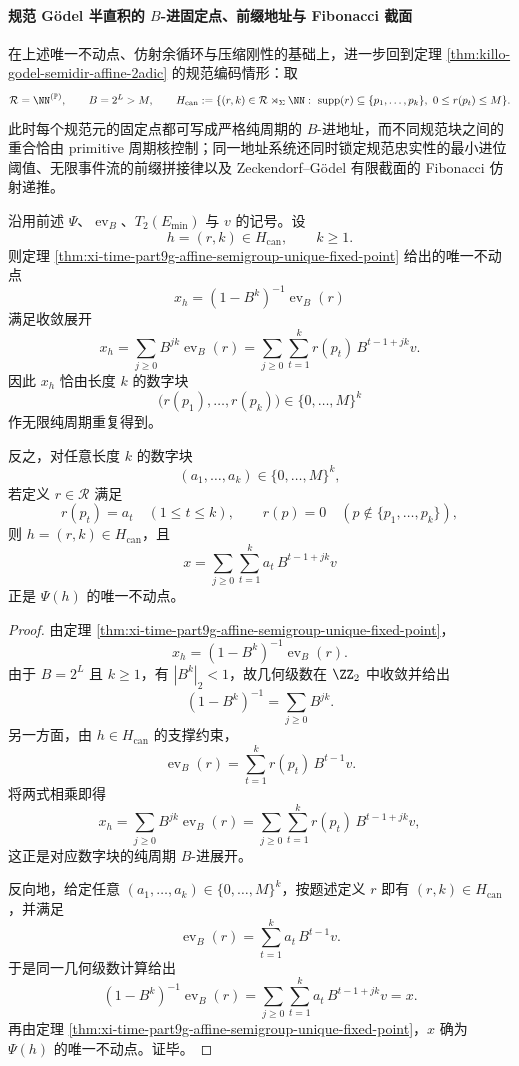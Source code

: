 \paragraph{规范 Gödel 半直积的 \texorpdfstring{$B$}{B}-进固定点、前缀地址与 Fibonacci 截面}
在上述唯一不动点、仿射余循环与压缩刚性的基础上，进一步回到定理 \ref{thm:killo-godel-semidir-affine-2adic} 的规范编码情形：取
\[
\mathcal R=\NN^{(\mathbb P)},
\qquad
B=2^L>M,
\qquad
H_{\mathrm{can}}
:=
\{(r,k)\in \mathcal R\rtimes_{\Sigma}\NN:\ \mathrm{supp}(r)\subseteq\{p_1,\dots,p_k\},\ 0\le r(p_t)\le M\}.
\]
此时每个规范元的固定点都可写成严格纯周期的 \(B\)-进地址，而不同规范块之间的重合恰由 primitive 周期核控制；同一地址系统还同时锁定规范忠实性的最小进位阈值、无限事件流的前缀拼接律以及 Zeckendorf--Gödel 有限截面的 Fibonacci 仿射递推。

\begin{theorem}\label{thm:xi-time-part9g-canonical-fixed-point-badic-periodic}
沿用前述 \(\Psi\)、\(\operatorname{ev}_B\)、\(T_2(E_{\min})\) 与 \(v\) 的记号。设
\[
h=(r,k)\in H_{\mathrm{can}},
\qquad
k\ge 1.
\]
则定理 \ref{thm:xi-time-part9g-affine-semigroup-unique-fixed-point} 给出的唯一不动点
\[
x_h=(1-B^k)^{-1}\operatorname{ev}_B(r)
\]
满足收敛展开
\[
x_h
=
\sum_{j\ge 0}B^{jk}\operatorname{ev}_B(r)
=
\sum_{j\ge 0}\sum_{t=1}^{k} r(p_t)\,B^{t-1+jk}v.
\]
因此 \(x_h\) 恰由长度 \(k\) 的数字块
\[
\bigl(r(p_1),\dots,r(p_k)\bigr)\in\{0,\dots,M\}^{k}
\]
作无限纯周期重复得到。

反之，对任意长度 \(k\) 的数字块
\[
(a_1,\dots,a_k)\in\{0,\dots,M\}^{k},
\]
若定义 \(r\in\mathcal R\) 满足
\[
r(p_t)=a_t\quad (1\le t\le k),
\qquad
r(p)=0\quad (p\notin\{p_1,\dots,p_k\}),
\]
则 \(h=(r,k)\in H_{\mathrm{can}}\)，且
\[
x=\sum_{j\ge 0}\sum_{t=1}^{k} a_t\,B^{t-1+jk}v
\]
正是 \(\Psi(h)\) 的唯一不动点。
\end{theorem}
\begin{proof}
由定理 \ref{thm:xi-time-part9g-affine-semigroup-unique-fixed-point}，
\[
x_h=(1-B^k)^{-1}\operatorname{ev}_B(r).
\]
由于 \(B=2^L\) 且 \(k\ge 1\)，有 \(|B^k|_2<1\)，故几何级数在 \(\ZZ_2\) 中收敛并给出
\[
(1-B^k)^{-1}=\sum_{j\ge 0}B^{jk}.
\]
另一方面，由 \(h\in H_{\mathrm{can}}\) 的支撑约束，
\[
\operatorname{ev}_B(r)=\sum_{t=1}^{k}r(p_t)\,B^{t-1}v.
\]
将两式相乘即得
\[
x_h
=
\sum_{j\ge 0}B^{jk}\operatorname{ev}_B(r)
=
\sum_{j\ge 0}\sum_{t=1}^{k} r(p_t)\,B^{t-1+jk}v,
\]
这正是对应数字块的纯周期 \(B\)-进展开。

反向地，给定任意 \((a_1,\dots,a_k)\in\{0,\dots,M\}^{k}\)，按题述定义 \(r\) 即有
\((r,k)\in H_{\mathrm{can}}\)，并满足
\[
\operatorname{ev}_B(r)=\sum_{t=1}^{k}a_t\,B^{t-1}v.
\]
于是同一几何级数计算给出
\[
(1-B^k)^{-1}\operatorname{ev}_B(r)
=
\sum_{j\ge 0}\sum_{t=1}^{k} a_t\,B^{t-1+jk}v=x.
\]
再由定理 \ref{thm:xi-time-part9g-affine-semigroup-unique-fixed-point}，\(x\) 确为 \(\Psi(h)\) 的唯一不动点。证毕。
\end{proof}

